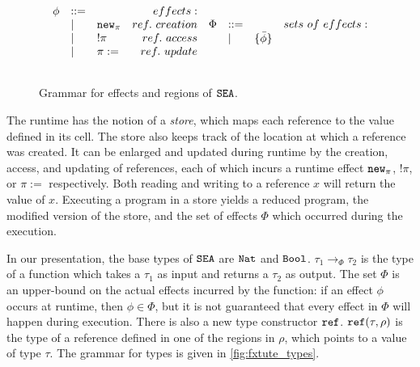 \begin{figure}[h]

\[
\begin{array}{c}

\begin{array}{lllr}

\phi & ::= & ~ & effects: \\
	& | & \mathtt{new}_{\pi} & ref.~creation\\
	& | & !\pi & ref.~access \\
	& | & \pi := & ref.~update \\
	&&\\
	
\end{array}
	
\begin{array}{lllr}

\Phi & ::= & ~ & sets~of~effects: \\
	& | & \{ \bar \phi \} \\
	&&\\
	
\end{array}
	
\end{array}
\]

\vspace{-12pt}
\caption{Grammar for effects and regions of $\mathtt{SEA}$.}
\label{fig:fxtute_fx_regions}
\end{figure}

The runtime has the notion of a \textit{store}, which maps each reference to the value defined in its cell. The store also keeps track of the location at which a reference was created. It can be enlarged and updated during runtime by the creation, access, and updating of references, each of which incurs a runtime effect $\mathtt{new}_{\pi}$, $!\pi$, or $\pi :=$ respectively. Both reading and writing to a reference $x$ will return the value of $x$. Executing a program in a store yields a reduced program, the modified version of the store, and the set of effects $\Phi$ which occurred during the execution.

In our presentation, the base types of $\mathtt{SEA}$ are $\mathtt{Nat}$ and $\mathtt{Bool}$. $\tau_1 \rightarrow_{\Phi} \tau_2$ is the type of a function which takes a $\tau_1$ as input and returns a $\tau_2$ as output. The set $\Phi$ is an upper-bound on the actual effects incurred by the function: if an effect $\phi$ occurs at runtime, then $\phi \in \Phi$, but it is not guaranteed that every effect in $\Phi$ will happen during execution. There is also a new type constructor $\mathtt{ref}$. $\mathtt{ref}(\tau, \rho)$ is the type of a reference defined in one of the regions in $\rho$, which points to a value of type $\tau$. The grammar for types is given in \ref{fig:fxtute_types}.


